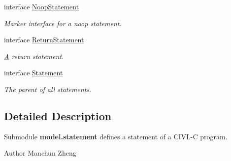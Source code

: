 \begin{DoxyCompactItemize}
interface \hyperlink{interfaceedu_1_1udel_1_1cis_1_1vsl_1_1civl_1_1model_1_1IF_1_1statement_1_1NoopStatement}{Noop\+Statement}
\begin{DoxyCompactList}\small\item\em Marker interface for a noop statement. \end{DoxyCompactList}\item 
interface \hyperlink{interfaceedu_1_1udel_1_1cis_1_1vsl_1_1civl_1_1model_1_1IF_1_1statement_1_1ReturnStatement}{Return\+Statement}
\begin{DoxyCompactList}\small\item\em \hyperlink{structA}{A} return statement. \end{DoxyCompactList}\item 
interface \hyperlink{interfaceedu_1_1udel_1_1cis_1_1vsl_1_1civl_1_1model_1_1IF_1_1statement_1_1Statement}{Statement}
\begin{DoxyCompactList}\small\item\em The parent of all statements. \end{DoxyCompactList}\end{DoxyCompactItemize}


\subsection{Detailed Description}
Submodule {\bfseries model.\+statement} defines a statement of a C\+I\+V\+L-\/\+C program. 

\begin{DoxyAuthor}{Author}
Manchun Zheng 
\end{DoxyAuthor}
